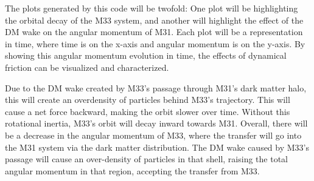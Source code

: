 \documentclass[fleqn,usenatbib]{mnras}
\begin{document}
\vspace{10pt}

The plots generated by this code will be twofold: One plot will be highlighting the orbital decay of the M33 system, and another will highlight the effect of the DM wake on the angular momentum of M31. Each plot will be a representation in time, where time is on the x-axis and angular momentum is on the y-axis. By showing this angular momentum evolution in time, the effects of dynamical friction can be visualized and characterized. 

\vspace{10pt}

Due to the DM wake created by M33's passage through M31's dark matter halo, this will create an overdensity of particles behind M33's trajectory. This will cause a net force backward, making the orbit slower over time. Without this rotational inertia, M33's orbit will decay inward towards M31. Overall, there will be a decrease in the angular momentum of M33, where the transfer will go into the M31 system via the dark matter distribution. The DM wake caused by M33's passage will cause an over-density of particles in that shell, raising the total angular momentum in that region, accepting the transfer from M33. 



















\bsp	%
\label{lastpage}
\end{document}
